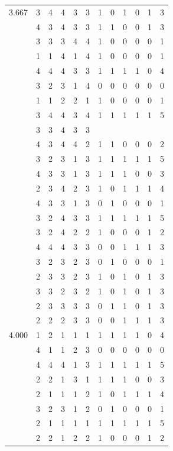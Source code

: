\documentclass[]{msu-thesis}
\theoremstyle{definition}
\theoremstyle{definition}
\theoremstyle{definition}
\theoremstyle{remark}
\begin{document}
\begin{table}
{\begin{tabular}[t]{rrrrrrrrrrrr}
3.667 & 3 & 4 & 4 & 3 & 3 & 1 & 0 & 1 & 0 & 1 & 3\\
 & 4 & 3 & 4 & 3 & 3 & 1 & 1 & 0 & 0 & 1 & 3\\
 & 3 & 3 & 3 & 4 & 4 & 1 & 0 & 0 & 0 & 0 & 1\\
 & 1 & 1 & 4 & 1 & 4 & 1 & 0 & 0 & 0 & 0 & 1\\
 & 4 & 4 & 4 & 3 & 3 & 1 & 1 & 1 & 1 & 0 & 4\\
 & 3 & 2 & 3 & 1 & 4 & 0 & 0 & 0 & 0 & 0 & 0\\
 & 1 & 1 & 2 & 2 & 1 & 1 & 0 & 0 & 0 & 0 & 1\\
 & 3 & 4 & 4 & 3 & 4 & 1 & 1 & 1 & 1 & 1 & 5\\
 & 3 & 3 & 4 & 3 & 3 &  &  &  &  &  & \\
 & 4 & 3 & 4 & 4 & 2 & 1 & 1 & 0 & 0 & 0 & 2\\
 & 3 & 2 & 3 & 1 & 3 & 1 & 1 & 1 & 1 & 1 & 5\\
 & 4 & 3 & 3 & 1 & 3 & 1 & 1 & 1 & 0 & 0 & 3\\
 & 2 & 3 & 4 & 2 & 3 & 1 & 0 & 1 & 1 & 1 & 4\\
 & 4 & 3 & 3 & 1 & 3 & 0 & 1 & 0 & 0 & 0 & 1\\
 & 3 & 2 & 4 & 3 & 3 & 1 & 1 & 1 & 1 & 1 & 5\\
 & 3 & 2 & 4 & 2 & 2 & 1 & 0 & 0 & 0 & 1 & 2\\
 & 4 & 4 & 4 & 3 & 3 & 0 & 0 & 1 & 1 & 1 & 3\\
 & 3 & 2 & 3 & 2 & 3 & 0 & 1 & 0 & 0 & 0 & 1\\
 & 2 & 3 & 3 & 2 & 3 & 1 & 0 & 1 & 0 & 1 & 3\\
 & 3 & 3 & 2 & 3 & 2 & 1 & 0 & 1 & 0 & 1 & 3\\
 & 2 & 3 & 3 & 3 & 3 & 0 & 1 & 1 & 0 & 1 & 3\\
 & 2 & 2 & 2 & 3 & 3 & 0 & 0 & 1 & 1 & 1 & 3\\
4.000 & 1 & 2 & 1 & 1 & 1 & 1 & 1 & 1 & 1 & 0 & 4\\
 & 4 & 1 & 1 & 2 & 3 & 0 & 0 & 0 & 0 & 0 & 0\\
 & 4 & 4 & 4 & 1 & 3 & 1 & 1 & 1 & 1 & 1 & 5\\
 & 2 & 2 & 1 & 3 & 1 & 1 & 1 & 1 & 0 & 0 & 3\\
 & 2 & 1 & 1 & 1 & 2 & 1 & 0 & 1 & 1 & 1 & 4\\
 & 3 & 2 & 3 & 1 & 2 & 0 & 1 & 0 & 0 & 0 & 1\\
 & 2 & 1 & 1 & 1 & 1 & 1 & 1 & 1 & 1 & 1 & 5\\
 & 2 & 2 & 1 & 2 & 2 & 1 & 0 & 0 & 0 & 1 & 2\\

\end{tabular}}
\end{table}
\end{document}
